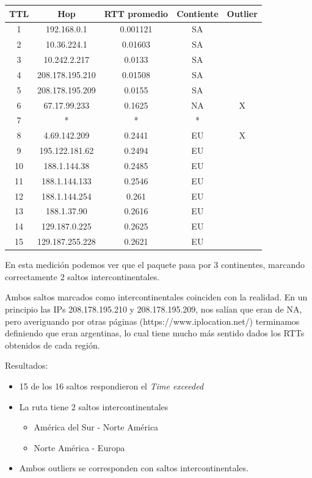 \documentclass[a4paper,10pt]{article}
\begin{document}
\begin{center}
\begin{tabular}{|c | c | c || c | c |}
    \hline
    TTL & Hop & RTT promedio & Contiente & Outlier \\ \hline
1 & 192.168.0.1 & 0.001121& SA &   \\ \hline
2 & 10.36.224.1 & 0.01603& SA &   \\ \hline
3 & 10.242.2.217 & 0.0133& SA &   \\ \hline
4 & 208.178.195.210 & 0.01508& SA &   \\ \hline
5 & 208.178.195.209 & 0.0155& SA &   \\ \hline
6 & 67.17.99.233 & 0.1625& NA & X \\ \hline
7 & * & * & * &  \\ \hline
8 & 4.69.142.209 & 0.2441& EU & X \\ \hline
9 & 195.122.181.62 & 0.2494& EU &   \\ \hline
10 & 188.1.144.38 & 0.2485& EU &   \\ \hline
11 & 188.1.144.133 & 0.2546& EU &   \\ \hline
12 & 188.1.144.254 & 0.261& EU &   \\ \hline
13 & 188.1.37.90 & 0.2616& EU &   \\ \hline
14 & 129.187.0.225 & 0.2625& EU &   \\ \hline
15 & 129.187.255.228 & 0.2621& EU &   \\ \hline
    
  
\end{tabular}
\end{center}
\medskip
\medskip
\medskip

\par{En esta medición podemos ver que el paquete pasa por 3 continentes, marcando correctamente 2 saltos intercontinentales.} 
\par{Ambos saltos marcados como intercontinentales coinciden con la realidad. En un principio las IPs 208.178.195.210 y 208.178.195.209, nos salían que eran de NA, pero averiguando por otras páginas (https://www.iplocation.net/) terminamos definiendo que eran argentinas, lo cual tiene mucho más sentido dados los RTTs obtenidos de cada región.}
\medskip
\par{Resultados:}
\begin{itemize}
    \item  15 de los 16 saltos respondieron el \textit{Time exceeded}
    \item La ruta tiene 2 saltos intercontinentales
    \begin{itemize}
        \item América del Sur - Norte América
        \item Norte América - Europa
    \end{itemize}
    \item Ambos outliers se corresponden con saltos intercontinentales.
\end{itemize}
\end{document}
